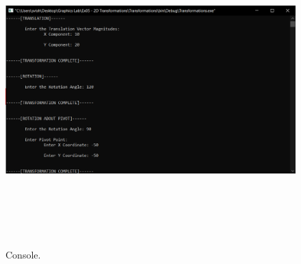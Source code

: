\documentclass[12pt, a4]{article}
\begin{document}
\subsection*{}
\begin{figure}[h]
\centering
\caption{Console.}
\includegraphics[height=12cm, width=17cm]{Outputs/Console-4.png}
\end{figure}

\newpage
\end{document}
